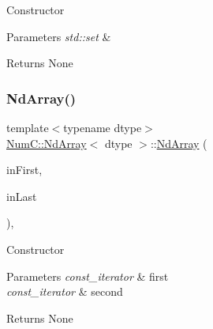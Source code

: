 Constructor


\begin{DoxyParams}{Parameters}
{\em std\+::set} & \\
\hline
\end{DoxyParams}
\begin{DoxyReturn}{Returns}
None 
\end{DoxyReturn}
\mbox{\label{class_num_c_1_1_nd_array_a27533d2cbbffc8572e42c17027f5b2f1}} 
\subsubsection{\texorpdfstring{Nd\+Array()}{NdArray()}\hspace{0.1cm}{\footnotesize\ttfamily [9/12]}}
{\footnotesize\ttfamily template$<$typename dtype$>$ \\
\mbox{\hyperlink{class_num_c_1_1_nd_array}{Num\+C\+::\+Nd\+Array}}$<$ dtype $>$\+::\mbox{\hyperlink{class_num_c_1_1_nd_array}{Nd\+Array}} (\begin{DoxyParamCaption}\item[{\mbox{\hyperlink{class_num_c_1_1_nd_array_a445cec326684b0066bddae07ba06eddf}{const\+\_\+iterator}}}]{in\+First,  }\item[{\mbox{\hyperlink{class_num_c_1_1_nd_array_a445cec326684b0066bddae07ba06eddf}{const\+\_\+iterator}}}]{in\+Last }\end{DoxyParamCaption})\hspace{0.3cm}{\ttfamily [inline]}, {\ttfamily [explicit]}}

Constructor


\begin{DoxyParams}{Parameters}
{\em const\+\_\+iterator} & first \\
\hline
{\em const\+\_\+iterator} & second \\
\hline
\end{DoxyParams}
\begin{DoxyReturn}{Returns}
None 
\end{DoxyReturn}
\mbox{\label{class_num_c_1_1_nd_array_aeddcb74a88d62e836396af0e807d44c1}} 
